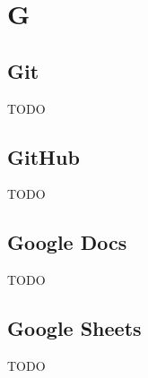 \section{G}

\subsection{Git}
TODO

\subsection{GitHub}
TODO

\subsection{Google Docs}
TODO

\subsection{Google Sheets}
TODO